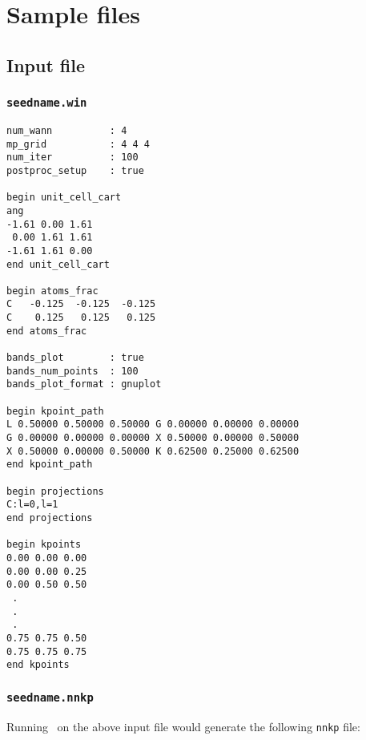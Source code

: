 \chapter{Sample files}

\section{Input file}\label{chap:input}
\subsection{{\tt seedname.win}}
\begin{verbatim}
num_wann          : 4 
mp_grid           : 4 4 4 
num_iter          : 100
postproc_setup    : true

begin unit_cell_cart
ang
-1.61 0.00 1.61
 0.00 1.61 1.61
-1.61 1.61 0.00
end unit_cell_cart

begin atoms_frac
C   -0.125  -0.125  -0.125
C    0.125   0.125   0.125
end atoms_frac

bands_plot        : true
bands_num_points  : 100
bands_plot_format : gnuplot

begin kpoint_path
L 0.50000 0.50000 0.50000 G 0.00000 0.00000 0.00000
G 0.00000 0.00000 0.00000 X 0.50000 0.00000 0.50000
X 0.50000 0.00000 0.50000 K 0.62500 0.25000 0.62500
end kpoint_path

begin projections
C:l=0,l=1
end projections

begin kpoints
0.00 0.00 0.00
0.00 0.00 0.25
0.00 0.50 0.50
 .
 .
 .
0.75 0.75 0.50
0.75 0.75 0.75
end kpoints

\end{verbatim}

\subsection{{\tt seedname.nnkp}}
Running \wannier\ on the above input file would generate the
following \verb#nnkp# file: 

